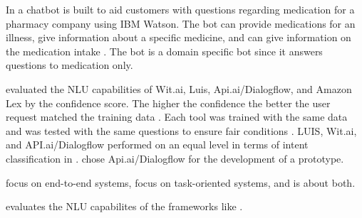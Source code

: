 In \citet{pharmacybot} a chatbot is built to aid customers with questions regarding medication for a 
pharmacy company using IBM Watson.
The bot can provide medications for an illness, give information about a specific medicine, and can 
give information on the medication intake \cite{pharmacybot}.
The bot is a domain specific bot since it answers questions to medication only.

\citet{gregori2017evaluation} evaluated the NLU capabilities of Wit.ai, Luis, Api.ai/Dialogflow, and Amazon Lex
by the confidence score. 
The higher the confidence the better the user request matched the training data \citet{gregori2017evaluation}.
Each tool was trained with the same data and was tested with the same questions to ensure fair conditions \citet{gregori2017evaluation}.
LUIS, Wit.ai, and API.ai/Dialogflow performed on an equal level in terms of intent classification in \citet{gregori2017evaluation}.
\citet{gregori2017evaluation} chose Api.ai/Dialogflow for the development of a prototype.

\citet{evaluateChatbotsShawar2007,bordes2016learning,williams2017hybrid} 
focus on end-to-end systems, \citet{braunEvaluatingNLU, dutta2017developing,luis2015williams,rasabocklisch2017,pharmacybot,gregori2017evaluation}
focus on task-oriented systems, and \citet{singhbuilding} is about both.

\citet{braunEvaluatingNLU} evaluates the NLU capabilites of the frameworks like \citet{}.



